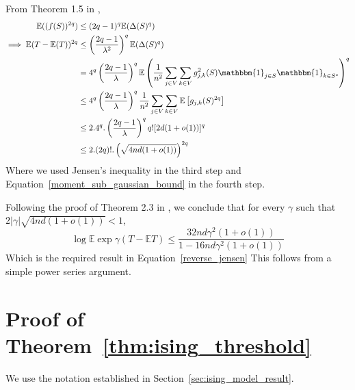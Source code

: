 \documentclass[final,12pt]{colt2018}
\begin{document}
From Theorem 1.5 in \citet{chatterjee2007stein},
\begin{align}
\mathbb{E}((f(S))^{2q}) &\leq (2q-1)^q \mathbb{E}(\Delta(S)^q) \nonumber \\
\implies\mathbb{E} (T-\mathbb{E}(T))^{2q} &\leq \left(\frac{2q-1}{\lambda^2}\right)^{q} \mathbb{E}(\Delta(S)^q)\nonumber \\
&= 4^q\left(\frac{2q-1}{\lambda}\right)^{q} \mathbb{E}\left(\frac{1}{n^2}\sum_{j\in V}\sum_{k \in V} g_{j,k}^2(S)\mathbbm{1}_{j\in S}\mathbbm{1}_{k \in S^c}\right)^q \nonumber \\
&\leq 4^q \left(\frac{2q-1}{\lambda}\right)^{q} \frac{1}{n^2} \sum_{j\in V}\sum_{k \in V}\mathbb{E}\left[g_{j,k}(S)^{2q}\right] \nonumber \\
&\leq 2.4^{q}.\left(\frac{2q-1}{\lambda}\right)^{q}q![2d(1+o(1))]^q \nonumber \\
&\leq 2.(2q)!.\left(\sqrt{4nd(1+o(1))}\right)^{2q} \label{sub_gamma_moment}
\end{align}
Where we used Jensen's inequality in the third step and Equation~\eqref{moment_sub_gaussian_bound} in the fourth step.


Following the proof of Theorem 2.3 in \citet{boucheron2013concentration}, we conclude that for every $\gamma$ such that $ 2|\gamma|\sqrt{4nd(1+o(1))} < 1 $, 
\begin{equation}
\log{\mathbb{E}\exp{\gamma(T - \mathbb{E}T)}} \leq \frac{32nd\gamma^2(1+o(1))}{ 1 - 16nd\gamma^2(1+o(1))}  \nonumber
\end{equation}
Which is the required result in Equation~\eqref{reverse_jensen}
This follows from a simple power series argument.
\section{Proof of Theorem~\ref{thm:ising_threshold}}

\label{sec:ising_proof}
We use the notation established in Section~\ref{sec:ising_model_result}.
\end{document}

